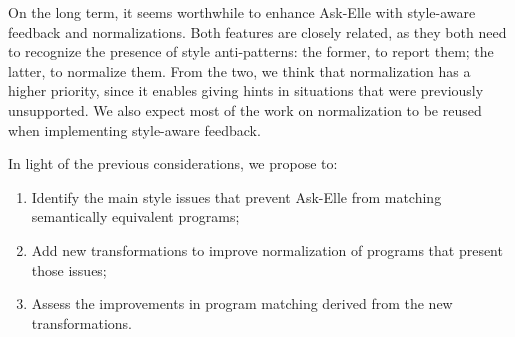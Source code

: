 On the long term, it seems worthwhile to enhance Ask-Elle with style-aware feedback and normalizations. Both features are closely related, as they both need to recognize the presence of style anti-patterns: the former, to report them; the latter, to normalize them. From the two, we think that normalization has a higher priority, since it enables giving hints in situations that were previously unsupported. We also expect most of the work on normalization to be reused when implementing style-aware feedback.

In light of the previous considerations, we propose to:

\begin{enumerate}
    \item Identify the main style issues that prevent Ask-Elle from matching semantically equivalent programs;
    \item Add new transformations to improve normalization of programs that present those issues;
    \item Assess the improvements in program matching derived from the new transformations.
\end{enumerate}

